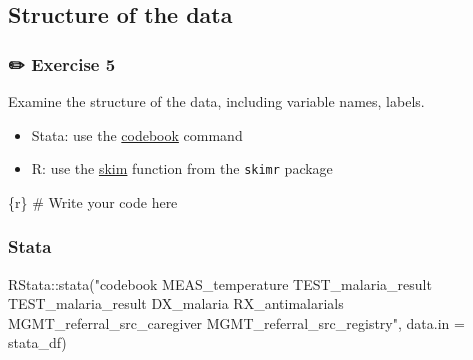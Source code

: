 \documentclass[
  letterpaper,
  DIV=11,
  numbers=noendperiod,
  oneside]{scrreprt}
\newenvironment{Shaded}{\begin{snugshade}}{\end{snugshade}}
\newcommand{\AttributeTok}[1]{\textcolor[rgb]{0.40,0.45,0.13}{#1}}
\newcommand{\CommentTok}[1]{\textcolor[rgb]{0.37,0.37,0.37}{#1}}
\newcommand{\FunctionTok}[1]{\textcolor[rgb]{0.28,0.35,0.67}{#1}}
\newcommand{\InformationTok}[1]{\textcolor[rgb]{0.37,0.37,0.37}{#1}}
\newcommand{\NormalTok}[1]{\textcolor[rgb]{0.00,0.23,0.31}{#1}}
\newcommand{\SpecialCharTok}[1]{\textcolor[rgb]{0.37,0.37,0.37}{#1}}
\newcommand{\StringTok}[1]{\textcolor[rgb]{0.13,0.47,0.30}{#1}}
\providecommand{\tightlist}{%
  \setlength{\itemsep}{0pt}\setlength{\parskip}{0pt}}\usepackage{longtable,booktabs,array}
\begin{document}
\hypertarget{structure-of-the-data-2}{%
\subsection{Structure of the data}\label{structure-of-the-data-2}}

\hypertarget{exercise-5}{%
\subsubsection{\texorpdfstring{{✏️} Exercise
5}{✏️ Exercise 5}}\label{exercise-5}}

Examine the structure of the data, including variable names, labels.

\begin{tcolorbox}[enhanced jigsaw, colbacktitle=quarto-callout-tip-color!10!white, titlerule=0mm, breakable, opacityback=0, opacitybacktitle=0.6, left=2mm, coltitle=black, colback=white, title=\textcolor{quarto-callout-tip-color}{\faLightbulb}\hspace{0.5em}{Tip}, rightrule=.15mm, colframe=quarto-callout-tip-color-frame, toprule=.15mm, bottomtitle=1mm, toptitle=1mm, arc=.35mm, bottomrule=.15mm, leftrule=.75mm]

\begin{itemize}
\tightlist
\item
  Stata: use the
  \href{https://www.stata.com/manuals/dcodebook.pdf}{codebook} command
\item
  R: use the
  \href{https://docs.ropensci.org/skimr/reference/skim.html}{skim}
  function from the \texttt{skimr} package
\end{itemize}

\end{tcolorbox}

\begin{Shaded}
\begin{Highlighting}[]
\InformationTok{\textasciigrave{}\textasciigrave{}\textasciigrave{}\{r\}}
\CommentTok{\# Write your code here}
\InformationTok{\textasciigrave{}\textasciigrave{}\textasciigrave{}}
\end{Highlighting}
\end{Shaded}

\hypertarget{stata-8}{%
\subsubsection{Stata}\label{stata-8}}

\begin{Shaded}
\begin{Highlighting}[]
\NormalTok{RStata}\SpecialCharTok{::}\FunctionTok{stata}\NormalTok{(}\StringTok{"codebook MEAS\_temperature TEST\_malaria\_result TEST\_malaria\_result DX\_malaria RX\_antimalarials MGMT\_referral\_src\_caregiver MGMT\_referral\_src\_registry"}\NormalTok{,}
              \AttributeTok{data.in =}\NormalTok{ stata\_df)}
\end{Highlighting}
\end{Shaded}
\end{document}
